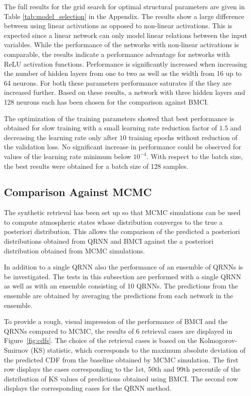 \documentclass[journal abbreviation, manuscript]{copernicus}
\begin{document}
  The full results for the grid search for optimal structural parameters are
  given in Table \ref{tab:model_selection} in the Appendix. The results show a
  large difference between using linear activations as opposed to non-linear
  activations. This is expected since a linear network can only model linear
  relations between the input variables. While the performance of the networks
  with non-linear activations is comparable, the results indicate a performance
  advantage for networks with ReLU activation functions. Performance is
  significantly increased when increasing the number of hidden layers from one
  to two as well as the width from 16 up to 64 neurons. For both these
  parameters performance saturates if the they are increased further. Based on
  these results, a network with three hidden layers and 128 neurons each has
  been chosen for the comparison against BMCI.

  The optimization of the training parameters showed that best performance is
  obtained for slow training with a small learning rate reduction factor of
  $1.5$ and decreasing the learning rate only after $10$ training epochs
  without reduction of the validation loss. No significant increase in
  performance could be observed for values of the learning rate minimum below
  $10^{-4}$. With respect to the batch size, the best results were obtained for
  a batch size of 128 samples.

\subsection{Comparison Against MCMC}

  The synthetic retrieval has been set up so that MCMC simulations can be used
  to compute atmospheric states whose distribution converges to the true a
  posteriori distribution. This allows the comparison of the predicted a
  posteriori distributions obtained from QRNN and BMCI against the a posteriori
  distribution obtained from MCMC simulations.

  In addition to a single QRNN also the performance of an ensemble of QRNNs is
  be investigated. The tests in this subsection are performed with a single QRNN
  as well as with an ensemble consisting of 10 QRNNs. The predictions from the
  ensemble are obtained by averaging the predictions from each network in the
  ensemble.

  To provide a rough, visual impression of the performance of BMCI and the QRNNs
  compared to MCMC, the results of 6 retrieval cases are displayed in
  Figure~\ref{fig:cdfs}. The choice of the retrieval cases is based on the
  Kolmogorov-Smirnov (KS) statistic, which corresponds to the maximum absolute
  deviation of the predicted CDF from the baseline obtained by MCMC
  simulation. The first row displays the cases corresponding to the 1st, 50th
  and 99th percentile of the distribution of KS values of predictions obtained
  using BMCI. The second row displays the corresponding cases for the QRNN
  method.
\end{document}
